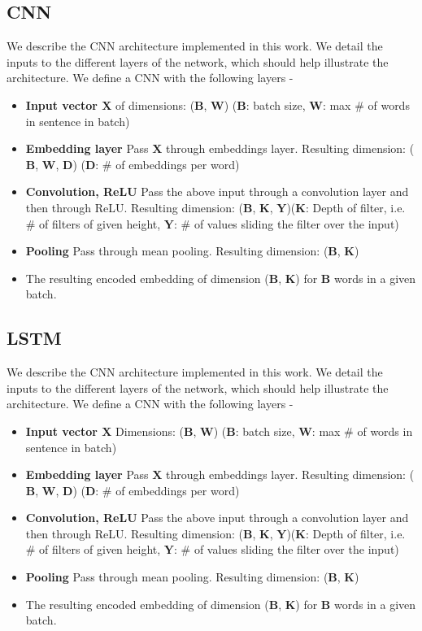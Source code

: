 \documentclass{sigkddExp}
\begin{document}
\subsection{CNN}
We describe the CNN architecture implemented in this work. We detail the inputs to the different layers of the network, which should help illustrate the architecture.
We define a CNN with the following layers -
\begin{itemize}[topsep=0pt,itemsep=-1ex,partopsep=1ex,parsep=1ex]
\item \textbf{Input vector $\mathbf{X}$} of dimensions: ($\mathbf{B}$, $\mathbf{W}$) ($\mathbf{B}$: batch size, $\mathbf{W}$: max \# of words in sentence in batch)
\item \textbf{Embedding layer} Pass $\mathbf{X}$ through embeddings layer. Resulting dimension: ($\mathbf{B}$, $\mathbf{W}$, $\mathbf{D}$) ($\mathbf{D}$: \# of embeddings per word)
\item \textbf{Convolution, ReLU} Pass the above input through a convolution layer and then through ReLU. Resulting dimension: ($\mathbf{B}$, $\mathbf{K}$, $\mathbf{Y}$)($\mathbf{K}$: Depth of filter, i.e. \# of filters of given height, $\mathbf{Y}$: \# of values sliding the filter over the input)
\item \textbf{Pooling} Pass through mean pooling. Resulting dimension: ($\mathbf{B}$, $\mathbf{K}$)
\item The resulting encoded embedding of dimension ($\mathbf{B}$, $\mathbf{K}$) for $\mathbf{B}$ words in a given batch.
\end{itemize}

\subsection{LSTM}
We describe the CNN architecture implemented in this work. We detail the inputs to the different layers of the network, which should help illustrate the architecture.
We define a CNN with the following layers -
\begin{itemize}[topsep=0pt,itemsep=-1ex,partopsep=1ex,parsep=1ex]
\item \textbf{Input vector $\mathbf{X}$} Dimensions: ($\mathbf{B}$, $\mathbf{W}$) ($\mathbf{B}$: batch size, $\mathbf{W}$: max \# of words in sentence in batch)
\item \textbf{Embedding layer} Pass $\mathbf{X}$ through embeddings layer. Resulting dimension: ($\mathbf{B}$, $\mathbf{W}$, $\mathbf{D}$) ($\mathbf{D}$: \# of embeddings per word)
\item \textbf{Convolution, ReLU} Pass the above input through a convolution layer and then through ReLU. Resulting dimension: ($\mathbf{B}$, $\mathbf{K}$, $\mathbf{Y}$)($\mathbf{K}$: Depth of filter, i.e. \# of filters of given height, $\mathbf{Y}$: \# of values sliding the filter over the input)
\item \textbf{Pooling} Pass through mean pooling. Resulting dimension: ($\mathbf{B}$, $\mathbf{K}$)
\item The resulting encoded embedding of dimension ($\mathbf{B}$, $\mathbf{K}$) for $\mathbf{B}$ words in a given batch.
\end{itemize}
\end{document}
